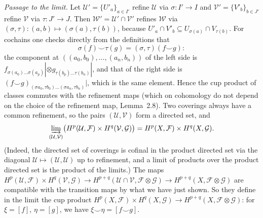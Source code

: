 \documentclass[11pt]{article}
\begin{document}
\emph{Passage to the limit.} Let $\mathcal U'=\{U'_a\}_{a\in I'}$ refine $\mathcal U$ via $\sigma:I'\to I$ and $\mathcal V'=\{V'_b\}_{b\in J'}$ refine $\mathcal V$ via $\tau:J'\to J$. Then $\mathcal W'=\mathcal U'\cap\mathcal V'$ refines $\mathcal W$ via $(\sigma,\tau):(a,b)\mapsto(\sigma(a),\tau(b))$, because $U'_a\cap V'_b\subseteq U_{\sigma(a)}\cap V_{\tau(b)}$. For cochains one checks directly from the definitions that
\[ \sigma(f)\smile\tau(g)=(\sigma,\tau)(f\smile g): \]
the component at $((a_0,b_0),\dots,(a_n,b_n))$ of the left side is $f_{\sigma(a_0)\dots\sigma(a_p)}|\otimes g_{\tau(b_p)\dots\tau(b_n)}|$, and that of the right side is $(f\smile g)_{(\sigma a_0,\tau b_0)\dots(\sigma a_n,\tau b_n)}|$, which is the same element. Hence the cup product of classes commutes with the refinement maps (which on cohomology do not depend on the choice of the refinement map, Lemma~2.8). Two coverings always have a common refinement, so the pairs $(\mathcal U,\mathcal V)$ form a directed set, and
\[ \varinjlim_{(\mathcal U,\mathcal V)}\bigl(H^p(\mathcal U,\mathcal F)\times H^q(\mathcal V,\mathcal G)\bigr)=H^p(X,\mathcal F)\times H^q(X,\mathcal G). \]
(Indeed, the directed set of coverings is cofinal in the product directed set via the diagonal $\mathcal U\mapsto(\mathcal U,\mathcal U)$ up to refinement, and a limit of products over the product directed set is the product of the limits.) The maps $H^p(\mathcal U,\mathcal F)\times H^q(\mathcal V,\mathcal G)\to H^{p+q}(\mathcal U\cap\mathcal V,\mathcal F\otimes\mathcal G)\to H^{p+q}(X,\mathcal F\otimes\mathcal G)$ are compatible with the transition maps by what we have just shown. So they define in the limit the cup product $H^p(X,\mathcal F)\times H^q(X,\mathcal G)\to H^{p+q}(X,\mathcal F\otimes\mathcal G)$: for $\xi=[f]$, $\eta=[g]$, we have $\xi\smile\eta=[f\smile g]$.
\end{document}

